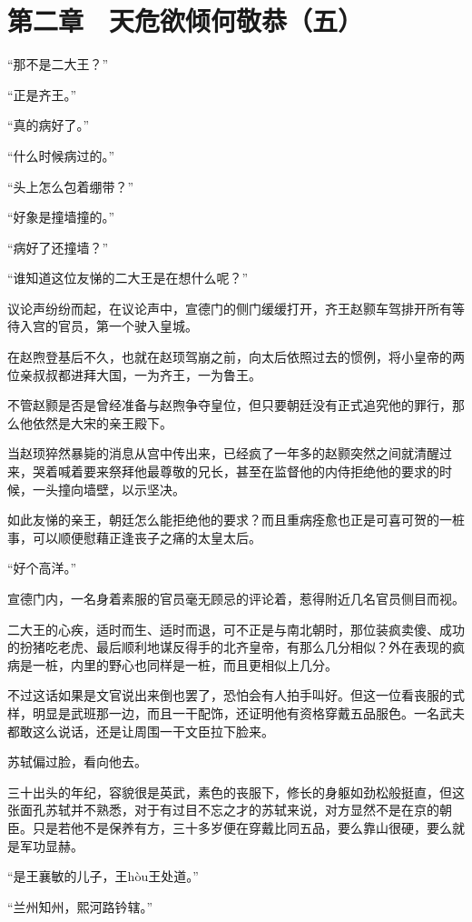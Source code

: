 \section{第二章　天危欲倾何敬恭（五）}

“那不是二大王？”

“正是齐王。”

“真的病好了。”

“什么时候病过的。”

“头上怎么包着绷带？”

“好象是撞墙撞的。”

“病好了还撞墙？”

“谁知道这位友悌的二大王是在想什么呢？”

议论声纷纷而起，在议论声中，宣德门的侧门缓缓打开，齐王赵颢车驾排开所有等待入宫的官员，第一个驶入皇城。

在赵煦登基后不久，也就在赵顼驾崩之前，向太后依照过去的惯例，将小皇帝的两位亲叔叔都进拜大国，一为齐王，一为鲁王。

不管赵颢是否是曾经准备与赵煦争夺皇位，但只要朝廷没有正式追究他的罪行，那么他依然是大宋的亲王殿下。

当赵顼猝然暴毙的消息从宫中传出来，已经疯了一年多的赵颢突然之间就清醒过来，哭着喊着要来祭拜他最尊敬的兄长，甚至在监督他的内侍拒绝他的要求的时候，一头撞向墙壁，以示坚决。

如此友悌的亲王，朝廷怎么能拒绝他的要求？而且重病痊愈也正是可喜可贺的一桩事，可以顺便慰藉正逢丧子之痛的太皇太后。

“好个高洋。”

宣德门内，一名身着素服的官员毫无顾忌的评论着，惹得附近几名官员侧目而视。

二大王的心疾，适时而生、适时而退，可不正是与南北朝时，那位装疯卖傻、成功的扮猪吃老虎、最后顺利地谋反得手的北齐皇帝，有那么几分相似？外在表现的疯病是一桩，内里的野心也同样是一桩，而且更相似上几分。

不过这话如果是文官说出来倒也罢了，恐怕会有人拍手叫好。但这一位看丧服的式样，明显是武班那一边，而且一干配饰，还证明他有资格穿戴五品服色。一名武夫都敢这么说话，还是让周围一干文臣拉下脸来。

苏轼偏过脸，看向他去。

三十出头的年纪，容貌很是英武，素色的丧服下，修长的身躯如劲松般挺直，但这张面孔苏轼并不熟悉，对于有过目不忘之才的苏轼来说，对方显然不是在京的朝臣。只是若他不是保养有方，三十多岁便在穿戴比同五品，要么靠山很硬，要么就是军功显赫。

“是王襄敏的儿子，王hòu王处道。”

“兰州知州，熙河路钤辖。”

